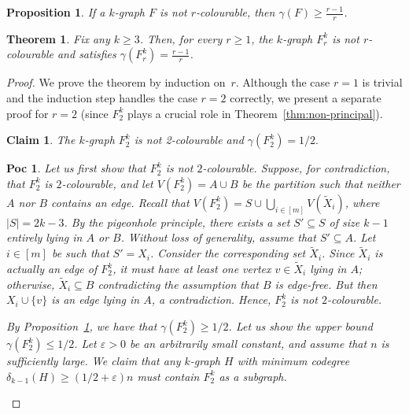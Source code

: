 \documentclass[10pt,a4paper]{amsart}
\newtheorem{theorem}{Theorem}
\newtheorem{proposition}{Proposition}
\newtheorem{claim}{Claim}
\newtheorem{poc}{Poc}
\begin{document}
\begin{proposition}\label{ob:KZ} If a $k$-graph $F$ is not $r$-colourable, then $\gamma(F)\ge \frac{r-1}{r}$.
\end{proposition}

\begin{theorem}\label{thm:F_r}
    Fix any $k \ge 3$. Then, for every $r\ge1$, the $k$-graph $F^k_r$ is not $r$-colourable and satisfies $\gamma(F^k_r) = \frac{r-1}{r}$.
\end{theorem}

\begin{proof}
We prove the theorem by induction on~$r$.
Although the case $r=1$ is trivial and the induction step handles the case $r=2$ correctly, we present a separate proof for $r=2$ (since $F_2^k$ plays a crucial role in Theorem~\ref{thm:non-principal}).
\begin{claim}\label{cl:gammaF2}
    The $k$-graph $F^k_2$ is not 2-colourable and $\gamma(F^k_2)=1/2.$
\end{claim}
\begin{poc}
    Let us first show that $F^k_2$ is not $2$-colourable. Suppose, for contradiction, that $F^k_2$ is $2$-colourable, and let $V(F^k_2)=A\cup B$ be the partition such that neither $A$ nor $B$ contains an edge. Recall that $V(F^k_2)= S\cup \bigcup_{i\in [m]}V(\tilde{X}_{i})$, where $|S|=2k-3$. By the pigeonhole principle, there exists a set $S'\subseteq S$ of size $k-1$ entirely lying in $A$ or $B$. Without loss of generality, assume that $S'\subseteq A$. Let $i\in [m]$ be such that $S'=X_i$. Consider the corresponding set $\tilde{X}_{i}$. Since $\tilde{X}_{i}$ is actually an edge of $F^k_2$, it must have at least one vertex $v\in \tilde{X}_{i}$ lying in $A$; otherwise, $\tilde{X}_{i}\subseteq B$ contradicting the assumption that $B$ is edge-free. But then $X_i\cup \{v\}$ is an edge lying in $A$, a contradiction. Hence,  $F^k_2$ is not $2$-colourable.

By Proposition~\ref{ob:KZ}, we have that $\gamma(F^k_2)\ge 1/2$. Let us show the upper bound $\gamma(F^k_2)\le 1/2$. Let $\varepsilon>0$ be an arbitrarily small constant, and assume that $n$ is sufficiently large. We claim that any $k$-graph $H$ with minimum codegree $\delta_{k-1}(H)\ge (1/2+\varepsilon)n$ must contain $F^k_2$ as a subgraph.
        

\end{poc}
\end{proof}
\end{document}
